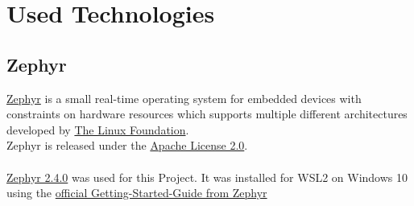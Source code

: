 %
%

\pagebreak

\section{Used Technologies}

\subsection{Zephyr}

\href{https://zephyrproject.org/}
{Zephyr} is a small real-time operating system for embedded devices with constraints
on hardware resources which supports multiple different architectures
developed by
\href{https://www.linuxfoundation.org/}
{The Linux Foundation}.\\
Zephyr is released under the
\href{https://www.apache.org/licenses/LICENSE-2.0.html}
{Apache License 2.0}.
\\
\\
\href{https://docs.zephyrproject.org/2.4.0/index.html}
{Zephyr 2.4.0} was used for this Project.
It was installed for WSL2 on Windows 10 using the
\href{https://docs.zephyrproject.org/2.4.0/getting_started/index.html}
{official Getting-Started-Guide from Zephyr}

